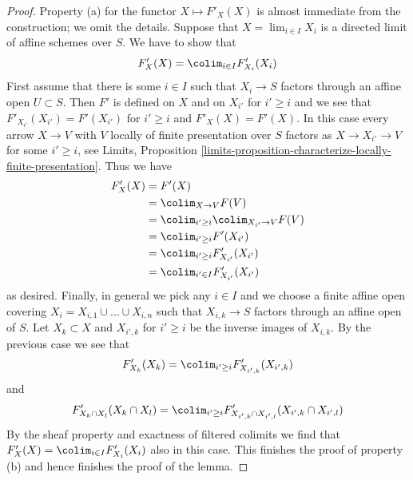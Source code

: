 \begin{proof}
\medskip\noindent
Property (a) for the functor $X \mapsto F'_X(X)$ is almost immediate
from the construction; we omit the details.
Suppose that $X = \lim_{i \in I} X_i$
is a directed limit of affine schemes over $S$. We have to show that
$$
F'_X(X) = \colim_{i \in I} F'_{X_i}(X_i)
$$
First assume that there is some $i \in I$ such that
$X_i \to S$ factors through an affine open $U \subset S$.
Then $F'$ is defined on $X$ and on $X_{i'}$ for $i' \geq i$
and we see that $F'_{X_{i'}}(X_{i'}) = F'(X_{i'})$ for
$i' \geq i$ and $F'_X(X) = F'(X)$. In this case every arrow
$X \to V$ with $V$ locally of finite presentation
over $S$ factors as $X \to X_{i'} \to V$ for some
$i' \geq i$, see Limits, Proposition
\ref{limits-proposition-characterize-locally-finite-presentation}.
Thus we have
\begin{align*}
F'_X(X)
& =
F'(X)  \\
& = \colim_{X \to V} F(V) \\
& =
\colim_{i' \geq i} \colim_{X_{i'} \to V} F(V) \\
& =
\colim_{i' \geq i} F'(X_{i'}) \\
& =
\colim_{i' \geq i} F'_{X_{i'}}(X_{i'}) \\
& =
\colim_{i' \in I} F'_{X_{i'}}(X_{i'})
\end{align*}
as desired. Finally, in general we pick any $i \in I$ and we choose
a finite affine open covering $X_i = X_{i, 1} \cup \ldots \cup X_{i, n}$
such that $X_{i, k} \to S$ factors through an affine open of $S$.
Let $X_k \subset X$ and $X_{i', k}$ for $i' \geq i$
be the inverse images of $X_{i, k}$.
By the previous case we see that
$$
F'_{X_k}(X_k) = \colim_{i' \geq i} F'_{X_{i', k}}(X_{i', k})
$$
and
$$
F'_{X_k \cap X_l}(X_k \cap X_l) =
\colim_{i' \geq i}
F'_{X_{i', k} \cap X_{i', l}}(X_{i', k} \cap X_{i', l})
$$
By the sheaf property and exactness of filtered colimits
we find that $F'_X(X) = \colim_{i \in I} F'_{X_i}(X_i)$
also in this case. This finishes the proof of property (b)
and hence finishes the proof of the lemma.
\end{proof}

